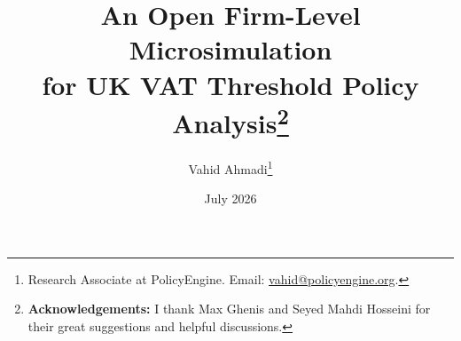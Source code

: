 \title{\bfseries An Open Firm-Level Microsimulation\\[0.15cm] for UK VAT Threshold Policy Analysis\thanks{\textbf{Acknowledgements:} I thank Max Ghenis and Seyed Mahdi Hosseini for their great suggestions and helpful discussions.}\\[0.7cm]}
\author{Vahid Ahmadi\thanks{Research Associate at PolicyEngine. Email: \href{mailto:vahid@policyengine.org}{vahid@policyengine.org}.}}
\date{\small July 2026}
